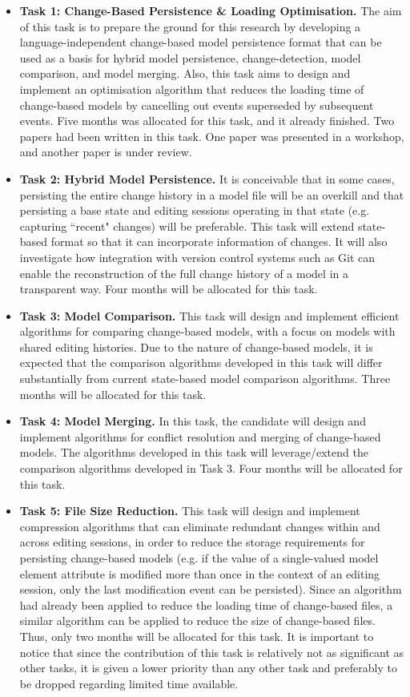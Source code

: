 \documentclass[12pt, a4paper]{report} \usepackage[titletoc]{appendix}
\begin{document}
\begin{itemize}
	\item \textbf{Task 1: Change-Based Persistence \& Loading Optimisation.}  The aim of this task is to prepare the ground for this research by developing a language-independent change-based model persistence format that can be used as a basis for hybrid model persistence, change-detection, model comparison, and model merging. Also, this task aims to design and implement an optimisation algorithm that reduces the loading time of change-based models by cancelling out events superseded by subsequent events. Five months was allocated for this task, and it already finished. Two papers had been written in this task. One paper was presented in a workshop, and another paper is under review.
	\item \textbf{Task 2: Hybrid Model Persistence.} It is conceivable that in some cases, persisting the entire change history in a model file will be an overkill and that persisting a base state and editing sessions operating in that state (e.g. capturing ``recent" changes) will be preferable. This task will extend state-based format so that it can incorporate information of changes. It will also investigate how integration with version control systems such as Git can enable the reconstruction of the full change history of a model in a transparent way. Four months will be allocated for this task. 
	\item \textbf{Task 3: Model Comparison.} This task will design and implement efficient algorithms for comparing change-based models, with a focus on models with shared editing histories. Due to the nature of change-based models, it is expected that the comparison algorithms developed in this task will differ substantially from current state-based model comparison algorithms. Three months will be allocated for this task. 
	\item \textbf{Task 4: Model Merging.} In this task, the candidate will design and implement algorithms for conflict resolution and merging of change-based models. The algorithms developed in this task will leverage/extend the comparison algorithms developed in Task 3. Four months will be allocated for this task. 
	\item \textbf{Task 5: File Size Reduction.} This task will design and implement compression algorithms that can eliminate redundant changes within and across editing sessions, in order to reduce the storage requirements for persisting change-based models (e.g. if the value of a single-valued model element attribute is modified more than once in the context of an editing session, only the last modification event can be persisted). Since an algorithm had already been applied to reduce the loading time of change-based files, a similar algorithm can be applied to reduce the size of change-based files. Thus, only two months will be allocated for this task. It is important to notice that since the contribution of this task is relatively not as significant as other tasks, it is given a lower priority than any other task and preferably to be dropped regarding limited time available.

\end{itemize}
\end{document}
